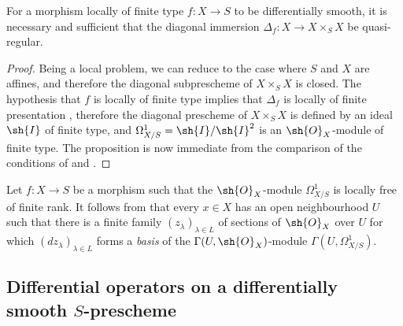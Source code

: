 \begin{proposition}[16.10.5]
\label{IV.16.10.5}
For a morphism locally of finite type $f:X \to S$ to be differentially smooth, it is necessary and sufficient that the diagonal immersion $\Delta_f:X \to X \times_S X$ be quasi-regular.
\end{proposition}
  

\begin{proof}
Being a local problem, we can reduce to the case where $S$ and $X$ are affines, and therefore the diagonal subprescheme of $X \times_S X$ is closed.
The hypothesis that $f$ is locally of finite type implies that $\Delta_f$ is locally of finite presentation , therefore the diagonal prescheme of $X \times_S X$ is defined by an ideal $\sh{I}$ of finite type, and $\Omega_{X/S}^1 = \sh{I}/\sh{I}^2$ is an $\sh{O}_X$-module of finite type.
The proposition is now immediate from the comparison of the conditions of  and . 
\end{proof}

\begin{remark}[16.10.6]
\label{IV.16.10.6}
Let $f:X \to S$ be a morphism such that the $\sh{O}_X$-module $\Omega_{X/S}^1$ is locally free of finite rank.
It follows from  that every $x \in X$ has an open neighbourhood $U$ such that there is a finite family $(z_\lambda)_{\lambda \in L}$ of sections of $\sh{O}_X$ over $U$ for which $(dz_\lambda)_{\lambda \in L}$ forms a \emph{basis} of the $\Gamma(U, \sh{O}_X)$-module $\Gamma(U, \Omega_{X/S}^1)$.
\end{remark}

\subsection{Differential operators on a differentially smooth $S$-prescheme}
\label{IV.16.11}

